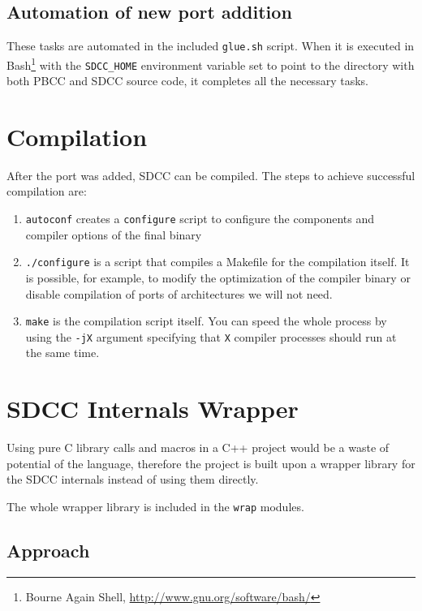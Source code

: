             \subsection{Automation of new port addition}

            These tasks are automated in the included \texttt{glue.sh} script. When it is executed in  Bash\footnote{Bourne Again Shell, \url{http://www.gnu.org/software/bash/}} with the \texttt{SDCC\_HOME} environment variable set to point to the directory with both PBCC and SDCC source code, it completes all the necessary tasks.

        \section{Compilation}

        After the port was added, SDCC can be compiled. The steps to achieve successful compilation are:

        \begin{enumerate}
        \item \texttt{autoconf} creates a \texttt{configure} script to configure the components and compiler options of the final binary
        \item \texttt{./configure} is a script that compiles a Makefile for the compilation itself. It is possible, for example, to modify the optimization of the compiler binary or disable compilation of ports of architectures we will not need.
        \item \texttt{make} is the compilation script itself. You can speed the whole process by using the \texttt{-jX} argument specifying that \texttt{X} compiler processes should run at the same time.
        \end{enumerate}

    \section{SDCC Internals Wrapper}

    Using pure C library calls and macros in a C++ project would be a waste of potential of the language, therefore the project is built upon a wrapper library for the SDCC internals instead of using them directly.

    The whole wrapper library is included in the \texttt{wrap} modules.

        \subsection{Approach}

